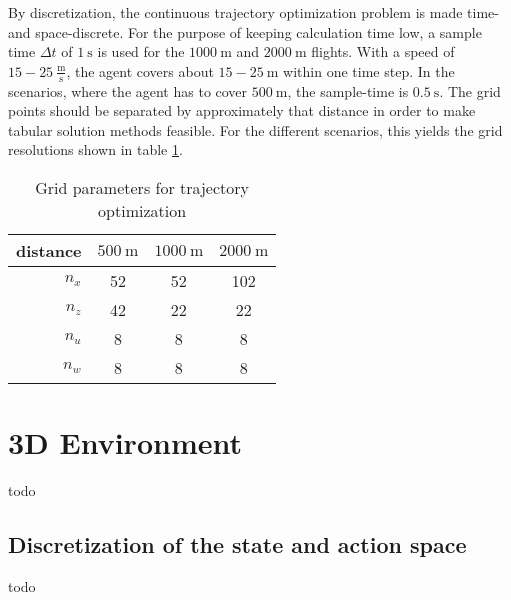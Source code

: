By discretization, the continuous trajectory optimization problem is made time- and space-discrete. For the purpose of keeping calculation time low, a sample time $\Delta t$ of $1~\text{s}$ is used for the $1000~\text{m}$ and $2000~\text{m}$ flights. With a speed of $15-25 ~\frac{\text{m}}{\text{s}}$, the agent covers about $15-25~\text{m}$ within one time step. In the scenarios, where the agent has to cover $500~\text{m}$, the sample-time is $0.5~\text{s}$. The grid points should be separated by approximately that distance in order to make tabular solution methods feasible. For the different scenarios, this yields the grid resolutions shown in table \ref{tab:grids}.
\begin{table}
	\begin{center}
		\begin{tabular}{r|c c c}
			distance & $500~\text{m}$ & $1000~\text{m}$ & $2000~\text{m}$ \\ \hline
			$n_x$ & 52 & 52 & 102 \\
			$n_z$ & 42 & 22 & 22\\
			$n_u$ & 8 & 8 & 8 \\
			$n_w$ & 8 & 8 & 8
		\end{tabular}
	\end{center}
	\caption{Grid parameters for trajectory optimization}
	\label{tab:grids}
\end{table}

\section{3D Environment}

todo

\subsection{Discretization of the state and action space}
\label{sec:disc3d}
todo